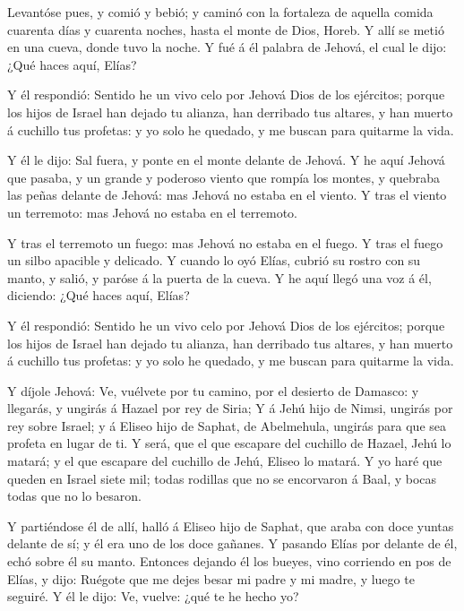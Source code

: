  Levantóse pues, y comió y bebió; y caminó con la fortaleza
de aquella comida cuarenta días y cuarenta noches, hasta el monte de
Dios, Horeb.  Y allí se metió en una cueva, donde tuvo la
noche. Y fué á él palabra de Jehová, el cual le dijo: ¿Qué haces aquí,
Elías?

 Y él respondió: Sentido he un vivo celo por Jehová Dios de
los ejércitos; porque los hijos de Israel han dejado tu alianza, han
derribado tus altares, y han muerto á cuchillo tus profetas: y yo solo
he quedado, y me buscan para quitarme la vida.

 Y él le dijo: Sal fuera, y ponte en el monte delante de
Jehová. Y he aquí Jehová que pasaba, y un grande y poderoso viento que
rompía los montes, y quebraba las peñas delante de Jehová: mas Jehová no
estaba en el viento. Y tras el viento un terremoto: mas Jehová no estaba
en el terremoto.

 Y tras el terremoto un fuego: mas Jehová no estaba en el
fuego. Y tras el fuego un silbo apacible y delicado.  Y
cuando lo oyó Elías, cubrió su rostro con su manto, y salió, y paróse á
la puerta de la cueva. Y he aquí llegó una voz á él, diciendo: ¿Qué
haces aquí, Elías?

 Y él respondió: Sentido he un vivo celo por Jehová Dios de
los ejércitos; porque los hijos de Israel han dejado tu alianza, han
derribado tus altares, y han muerto á cuchillo tus profetas: y yo solo
he quedado, y me buscan para quitarme la vida.

 Y díjole Jehová: Ve, vuélvete por tu camino, por el
desierto de Damasco: y llegarás, y ungirás á Hazael por rey de Siria;
 Y á Jehú hijo de Nimsi, ungirás por rey sobre Israel; y á
Eliseo hijo de Saphat, de Abelmehula, ungirás para que sea profeta en
lugar de ti.  Y será, que el que escapare del cuchillo de
Hazael, Jehú lo matará; y el que escapare del cuchillo de Jehú, Eliseo
lo matará.  Y yo haré que queden en Israel siete mil; todas
rodillas que no se encorvaron á Baal, y bocas todas que no lo besaron.

 Y partiéndose él de allí, halló á Eliseo hijo de Saphat,
que araba con doce yuntas delante de sí; y él era uno de los doce
gañanes. Y pasando Elías por delante de él, echó sobre él su manto.
 Entonces dejando él los bueyes, vino corriendo en pos de
Elías, y dijo: Ruégote que me dejes besar mi padre y mi madre, y luego
te seguiré. Y él le dijo: Ve, vuelve: ¿qué te he hecho yo?


